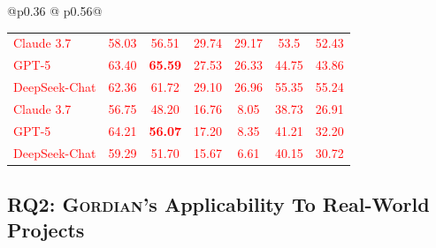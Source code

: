 \documentclass[acmsmall]{acmart}
\newcommand{\rev}[1]{\textcolor{red}{#1}}
\newcommand{\rev}[1]{#1}
\newcommand{\projName}{\textsc{Gordian}\xspace}
\theoremstyle{definition}
\begin{document}
\begin{table}[ht!]
\begin{tabular}{@{}p{}
@{\hspace{0.00\columnwidth}}
p{}@{}}
\begin{tabular}{|l|cc|cc|cc|}
\midrule
\rev{Claude 3.7}    & \rev{58.03} & \rev{56.51} & \rev{29.74} & \rev{29.17} & \rev{53.5} & \rev{52.43} \\
\rev{GPT-5}         & \rev{63.40} & \rev{\textbf{65.59}} & \rev{27.53} & \rev{26.33} & \rev{44.75} & \rev{43.86} \\
\rev{DeepSeek-Chat} & \rev{62.36} & \rev{61.72} & \rev{29.10} & \rev{26.96} & \rev{55.35} & \rev{55.24} \\
\midrule
\midrule
\rev{Claude 3.7}    & \rev{56.75} & \rev{48.20} & \rev{16.76} & \rev{8.05} & \rev{38.73} & \rev{26.91} \\
\rev{GPT-5}         & \rev{64.21} & \rev{\textbf{56.07}} & \rev{17.20} & \rev{8.35} & \rev{41.21} & \rev{32.20} \\
\rev{DeepSeek-Chat} & \rev{59.29} & \rev{51.70} & \rev{15.67} & \rev{6.61} & \rev{40.15} & \rev{30.72} \\
\bottomrule
\end{tabular}

\end{tabular}
\vspace{-4mm}
\end{table}


\subsection{RQ2: \projName's Applicability To Real-World Projects}
\end{document}
